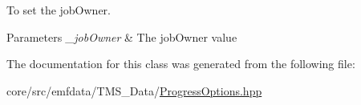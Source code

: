 To set the jobOwner. 


\begin{DoxyParams}{Parameters}
{\em \_\-jobOwner} & The jobOwner value \\
\hline
\end{DoxyParams}


The documentation for this class was generated from the following file:\begin{DoxyCompactItemize}
\item 
core/src/emfdata/TMS\_\-Data/\hyperlink{ProgressOptions_8hpp}{ProgressOptions.hpp}\end{DoxyCompactItemize}

